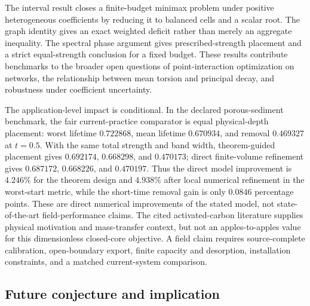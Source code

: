 \documentclass[10pt]{article}
\begin{document}
The interval result closes a finite-budget minimax problem under positive heterogeneous coefficients by reducing it to balanced cells and a scalar root. The graph identity gives an exact weighted deficit rather than merely an aggregate inequality. The spectral phase argument gives prescribed-strength placement and a strict equal-strength conclusion for a fixed budget. These results contribute benchmarks to the broader open questions of point-interaction optimization on networks, the relationship between mean torsion and principal decay, and robustness under coefficient uncertainty.

The application-level impact is conditional. In the declared porous-sediment benchmark, the fair current-practice comparator is equal physical-depth placement: worst lifetime $0.722868$, mean lifetime $0.670934$, and removal $0.469327$ at $t=0.5$. With the same total strength and band width, theorem-guided placement gives $0.692174$, $0.668298$, and $0.470173$; direct finite-volume refinement gives $0.687172$, $0.668226$, and $0.470197$. Thus the direct model improvement is $4.246\%$ for the theorem design and $4.938\%$ after local numerical refinement in the worst-start metric, while the short-time removal gain is only $0.0846$ percentage points. These are direct numerical improvements of the stated model, not state-of-the-art field-performance claims. The cited activated-carbon literature supplies physical motivation and mass-transfer context, but not an apples-to-apples value for this dimensionless closed-core objective. A field claim requires source-complete calibration, open-boundary export, finite capacity and desorption, installation constraints, and a matched current-system comparison.

\subsection{Future conjecture and implication}
\end{document}
